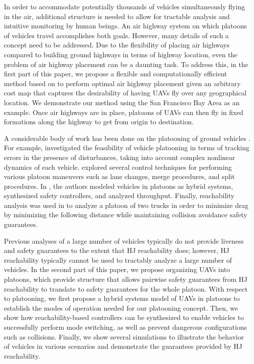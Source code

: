 In order to accommodate potentially thousands of vehicles simultaneously flying in the air, additional structure is needed to allow for tractable analysis and intuitive monitoring by human beings. An air highway system on which platoons of vehicles travel accomplishes both goals. However, many details of such a concept need to be addressed. Due to the flexibility of placing air highways compared to building ground highways in terms of highway location, even the problem of air highway placement can be a daunting task. To address this, in the first part of this paper, we propose a flexible and computationally efficient method based on \cite{Sethian96} to perform optimal air highway placement given an arbitrary cost map that captures the desirability of having UAVs fly over any geographical location. We demonstrate our method using the San Francisco Bay Area as an example. Once air highways are in place, platoons of UAVs can then fly in fixed formations along the highway to get from origin to destination.

A considerable body of work has been done on the platooning of ground vehicles \cite{Kavathekar11}. For example, \cite{McMahon90} investigated the feasibility of vehicle platooning in terms of tracking errors in the presence of disturbances, taking into account complex nonlinear dynamics of each vehicle.  \cite{Hedrick92} explored several control techniques for performing various platoon maneuvers such as lane changes, merge procedures, and split procedures. In \cite{Lygeros98}, the authors modeled vehicles in platoons as hybrid systems, synthesized safety controllers, and analyzed throughput. Finally, reachability analysis was used in \cite{Alam11} to analyze a platoon of two trucks in order to minimize drag by minimizing the following distance while maintaining collision avoidance safety guarantees.

Previous analyses of a large number of vehicles typically do not provide liveness and safety guarantees to the extent that HJ reachability does; however, HJ reachability typically cannot be used to tractably analyze a large number of vehicles. In the second part of this paper, we propose organizing UAVs into platoons, which provide structure that allows pairwise safety guarantees from HJ reachability to translate to safety guarantees for the whole platoon. With respect to platooning, we first propose a hybrid systems model of UAVs in platoons to establish the modes of operation needed for our platooning concept. Then, we show how reachability-based controllers can be synthesized to enable vehicles to successfully perform mode switching, as well as prevent dangerous configurations such as collisions. Finally, we show several simulations to illustrate the behavior of vehicles in various scenarios and demonstrate the guarantees provided by HJ reachability.